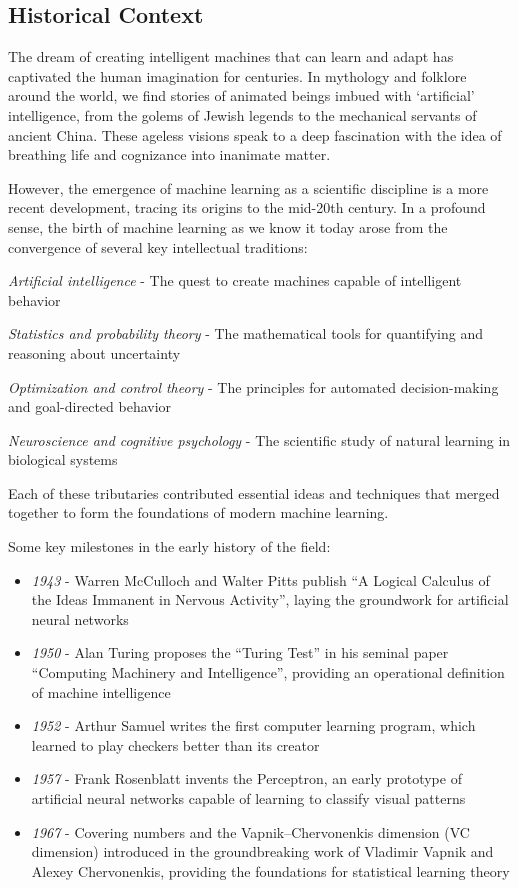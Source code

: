 \documentclass[
  9pt,
  letterpaper,
  abstract,
  titlepage]{scrbook}
\begin{document}
\subsection{Historical Context}\label{historical-context}

The dream of creating intelligent machines that can learn and adapt has
captivated the human imagination for centuries. In mythology and
folklore around the world, we find stories of animated beings imbued
with `artificial' intelligence, from the golems of Jewish legends to the
mechanical servants of ancient China. These ageless visions speak to a
deep fascination with the idea of breathing life and cognizance into
inanimate matter.

However, the emergence of machine learning as a scientific discipline is
a more recent development, tracing its origins to the mid-20th century.
In a profound sense, the birth of machine learning as we know it today
arose from the convergence of several key intellectual traditions:

\emph{Artificial intelligence} - The quest to create machines capable of
intelligent behavior

\emph{Statistics and probability theory} - The mathematical tools for
quantifying and reasoning about uncertainty

\emph{Optimization and control theory} - The principles for automated
decision-making and goal-directed behavior

\emph{Neuroscience and cognitive psychology} - The scientific study of
natural learning in biological systems

Each of these tributaries contributed essential ideas and techniques
that merged together to form the foundations of modern machine learning.

Some key milestones in the early history of the field:

\begin{itemize}
\item
  \emph{1943} - Warren McCulloch and Walter Pitts publish ``A Logical
  Calculus of the Ideas Immanent in Nervous Activity'', laying the
  groundwork for artificial neural networks
\item
  \emph{1950} - Alan Turing proposes the ``Turing Test'' in his seminal
  paper ``Computing Machinery and Intelligence'', providing an
  operational definition of machine intelligence
\item
  \emph{1952} - Arthur Samuel writes the first computer learning
  program, which learned to play checkers better than its creator
\item
  \emph{1957} - Frank Rosenblatt invents the Perceptron, an early
  prototype of artificial neural networks capable of learning to
  classify visual patterns
\item
  \emph{1967} - Covering numbers and the Vapnik--Chervonenkis dimension
  (VC dimension) introduced in the groundbreaking work of Vladimir
  Vapnik and Alexey Chervonenkis, providing the foundations for
  statistical learning theory
\end{itemize}
\end{document}
